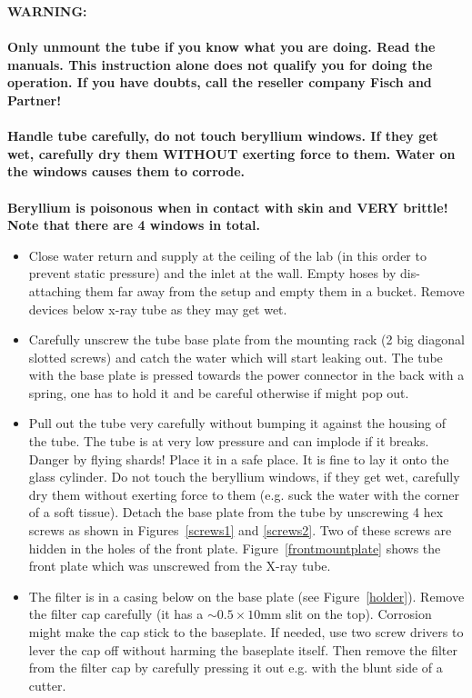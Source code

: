 \documentclass[a4paper,12pt,twoside]{article}
\begin{document}
\begin{appendices}
\textbf{
WARNING:  \\
\\
Only unmount the tube if you know what you are doing. Read the manuals. This instruction alone does not qualify you for doing the operation. If you have doubts, call the reseller company Fisch and Partner! \\
\\
Handle tube carefully, do not touch beryllium windows. If they get wet, carefully dry them WITHOUT exerting force to them. Water on the windows causes them to corrode. \\
\\
Beryllium is poisonous when in contact with skin and VERY brittle! Note that there are 4 windows in total.}

\begin{itemize}

\item Close water return and supply at the ceiling of the lab (in this order to prevent static pressure) and the inlet at the wall. Empty hoses by dis-attaching them far away from the setup and empty them in a bucket. Remove devices below x-ray tube as they may get wet.

\item Carefully unscrew the tube base plate from the mounting rack (2 big diagonal slotted screws) and catch the water which will start leaking out. The tube with the base plate is pressed towards the power connector in the back with a spring, one has to hold it and be careful otherwise if might pop out.

\item Pull out the tube very carefully without bumping it against the housing of the tube. The tube is at very low pressure and can implode if it breaks. Danger by flying shards! Place it in a safe place. It is fine to lay it onto the glass cylinder. Do not touch the beryllium windows, if they get wet, carefully dry them without exerting force to them (e.g. suck the water with the corner of a soft tissue). Detach the base plate from the tube by unscrewing 4 hex screws as shown in Figures~\ref{screws1} and \ref{screws2}. Two of these screws are hidden in the holes of the front plate. Figure~\ref{frontmountplate} shows the front plate which was unscrewed from the X-ray tube.

\item The filter is in a casing below on the base plate (see Figure~\ref{holder}). Remove the filter cap carefully (it has a $\sim 0.5 \times 10$\;\si{\milli\meter} slit on the top). Corrosion might make the cap stick to the baseplate. If needed, use two screw drivers to lever the cap off without harming the baseplate itself. Then remove the filter from the filter cap by carefully pressing it out e.g. with the blunt side of a cutter.


\end{itemize}
\end{appendices}
\end{document}
